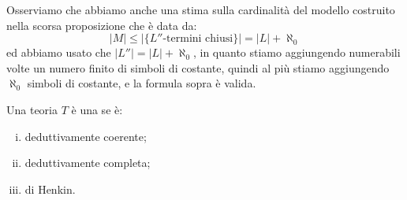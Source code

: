 \begin{remark}
    Osserviamo che abbiamo anche una stima sulla cardinalità del modello costruito nella scorsa proposizione che è data da:
    \[ |M| \leq |\{\text{$L''$-termini chiusi}\}| = |L| + \aleph_0 \]
    ed abbiamo usato che $|L''| = |L| + \aleph_0$, in quanto stiamo aggiungendo numerabili volte un numero finito di simboli di costante, quindi al più stiamo aggiungendo $\aleph_0$ simboli di costante, e la formula sopra è valida.
\end{remark}

\begin{definition}
    Una teoria $T$ è una  se è:
    \begin{enumerate}[(i)]
        \item deduttivamente coerente;
        \item deduttivamente completa;
        \item di Henkin.
    \end{enumerate}
\end{definition}